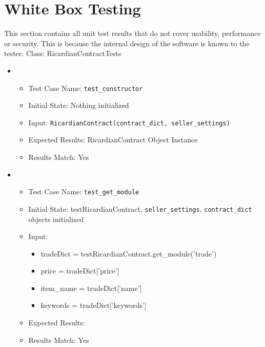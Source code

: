 \documentclass{article}
\begin{document}
\section{White Box Testing}
This section contains all unit test results that do not cover usability, performance or security. This is because the internal design of the software is known to the tester.\newline
\newline
Class: RicardianContractTests\newline
\begin{itemize}
\item
\begin{itemize}
\item Test Case Name: \texttt{test\_constructor}
\item Initial State: Nothing initialized
\item Input: \texttt{RicardianContract(\texttt{contract\_dict}, \texttt{seller\_settings})}
\item Expected Results: RicardianContract Object Instance
\item Results Match: Yes\newline
\end{itemize}
\end{itemize}

\begin{itemize}
\item
\begin{itemize}
\item Test Case Name: \texttt{test\_get\_module}
\item Initial State: testRicardianContract, \texttt{seller\_settings}, \texttt{contract\_dict} objects initialized
\item Input:
\begin{itemize}
\item tradeDict = testRicardianContract.get\_module('trade')
\item price = tradeDict['price']
\item item\_name = tradeDict['name']
\item keywords = tradeDict['keywords']
\end{itemize} 
\item Expected Results:
\item Results Match: Yes\newline
\end{itemize}
\end{itemize}
\end{document}
